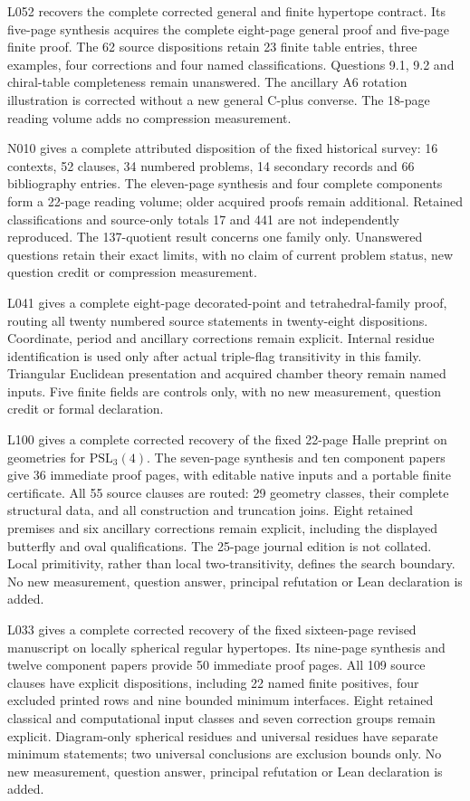 \documentclass[11pt,a4paper]{article}
\begin{document}
L052 recovers the complete corrected general and finite hypertope contract.
Its five-page synthesis acquires the complete eight-page general proof and
five-page finite proof. The 62 source dispositions retain 23 finite table
entries, three examples, four corrections and four named classifications.
Questions 9.1, 9.2 and chiral-table completeness remain unanswered. The
ancillary A6 rotation illustration is corrected without a new general
C-plus converse. The 18-page reading volume adds no compression measurement.

N010 gives a complete attributed disposition of the fixed historical survey:
16 contexts, 52 clauses, 34 numbered problems, 14 secondary records and
66 bibliography entries. The eleven-page synthesis and four complete
components form a 22-page reading volume; older acquired proofs remain
additional. Retained classifications and source-only totals 17 and 441
are not independently reproduced. The 137-quotient result concerns one
family only. Unanswered questions retain their exact limits, with no claim
of current problem status, new question credit or compression measurement.

L041 gives a complete eight-page decorated-point and tetrahedral-family
proof, routing all twenty numbered source statements in twenty-eight
dispositions. Coordinate, period and ancillary corrections remain explicit.
Internal residue identification is used only after actual triple-flag
transitivity in this family. Triangular Euclidean presentation and acquired
chamber theory remain named inputs. Five finite fields are controls only,
with no new measurement, question credit or formal declaration.

L100 gives a complete corrected recovery of the fixed 22-page Halle
preprint on geometries for $\mathrm{PSL}_3(4)$. The seven-page synthesis
and ten component papers give 36 immediate proof pages, with editable native
inputs and a portable finite certificate. All 55 source clauses are routed:
29 geometry classes, their complete structural data, and all construction
and truncation joins. Eight retained premises and six ancillary corrections
remain explicit, including the displayed butterfly and oval qualifications.
The 25-page journal edition is not collated. Local primitivity, rather than
local two-transitivity, defines the search boundary. No new measurement,
question answer, principal refutation or Lean declaration is added.

L033 gives a complete corrected recovery of the fixed sixteen-page revised
manuscript on locally spherical regular hypertopes. Its nine-page synthesis
and twelve component papers provide 50 immediate proof pages. All 109 source
clauses have explicit dispositions, including 22 named finite positives,
four excluded printed rows and nine bounded minimum interfaces. Eight retained
classical and computational input classes and seven correction groups remain
explicit. Diagram-only spherical residues and universal residues have separate
minimum statements; two universal conclusions are exclusion bounds only.
No new measurement, question answer, principal refutation or Lean declaration
is added.
\end{document}
